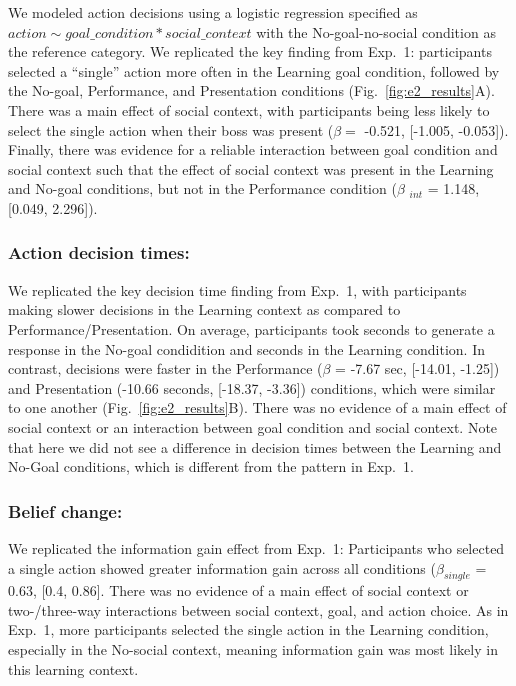 \documentclass[10pt, letterpaper]{article}
\begin{document}
We modeled action decisions using a logistic regression specified as
\texttt{$action \sim goal\_condition * social\_context$} with the
No-goal-no-social condition as the reference category. We replicated the
key finding from Exp.~1: participants selected a ``single'' action more
often in the Learning goal condition, followed by the No-goal,
Performance, and Presentation conditions (Fig.~\ref{fig:e2_results}A).
There was a main effect of social context, with participants being less
likely to select the single action when their boss was present
(\(\beta =\) -0.521, {[}-1.005, -0.053{]}). Finally, there was evidence
for a reliable interaction between goal condition and social context
such that the effect of social context was present in the Learning and
No-goal conditions, but not in the Performance condition (\(\beta\)
\(_{int}\) = 1.148, {[}0.049, 2.296{]}).

\subsubsection{Action decision times:}\label{action-decision-times-1}

We replicated the key decision time finding from Exp.~1, with
participants making slower decisions in the Learning context as compared
to Performance/Presentation. On average, participants took seconds to
generate a response in the No-goal condidition and seconds in the
Learning condition. In contrast, decisions were faster in the
Performance (\(\beta\) = -7.67 sec, {[}-14.01, -1.25{]}) and
Presentation (-10.66 seconds, {[}-18.37, -3.36{]}) conditions, which
were similar to one another (Fig.~\ref{fig:e2_results}B). There was no
evidence of a main effect of social context or an interaction between
goal condition and social context. Note that here we did not see a
difference in decision times between the Learning and No-Goal
conditions, which is different from the pattern in Exp.~1.

\subsubsection{Belief change:}\label{belief-change-1}

We replicated the information gain effect from Exp.~1: Participants who
selected a single action showed greater information gain across all
conditions (\(\beta_{single}\) = 0.63, {[}0.4, 0.86{]}. There was no
evidence of a main effect of social context or two-/three-way
interactions between social context, goal, and action choice. As in
Exp.~1, more participants selected the single action in the Learning
condition, especially in the No-social context, meaning information gain
was most likely in this learning context.
\end{document}
